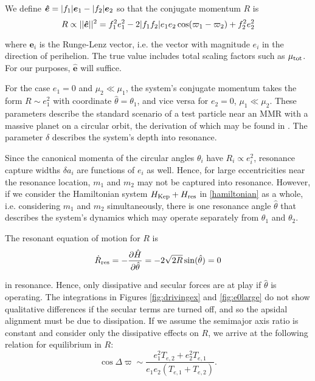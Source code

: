 \documentclass{mnras}
\renewcommand{\d}{\partial}
\renewcommand{\v}[1]{\boldsymbol{ #1 }}
\DeclarePairedDelimiter{\abs}{|}{|}
\DeclarePairedDelimiter{\norm}{||}{||}
\begin{document}
We define \(\v{\hat e} = \abs{f_1}\v e_1 - \abs{f_2}\v e_2\) so that
the conjugate momentum \(R\) is
\begin{equation}
  R \propto \norm{\v{\hat e}}^2  = f_1^2e_1^2 - 2\abs{f_1f_2}e_1e_2\cos(\varpi_1-\varpi_2) + f_2^2e_2^2
\end{equation}

where \(\v e_i\) is the Runge-Lenz vector, i.e. the vector with
magnitude \(e_i\) in the direction of perihelion. The true value
includes total scaling factors such as \(\mu_{\rm tot}\). For our
purposes, \(\v{\hat e}\) will suffice.

For the case \(e_1=0\) and \(\mu_2\ll\mu_1\), the system's conjugate
momentum takes the form \(R\sim e_1^2\) with coordinate \(\hat \theta =
\theta_1\), and vice versa for \(e_2=0\), \(\mu_1\ll\mu_2\).  These parameters
describe the standard scenario of a test particle near an MMR with a
massive planet on a circular orbit, the derivation of which may be
found in \cite{murray_solar_2000}. The parameter \(\delta\) describes the
system's depth into resonance.

Since the canonical momenta of the circular angles \(\theta_i\) have
\(R_i\propto e_i^2\), resonance capture widths \(\delta a_i\) are
functions of \(e_i\) as well. Hence, for large eccentricities near the
resonance location, \(m_1\) and \(m_2\) may not be captured into
resonance. However, if we consider the Hamiltonian system \(H_{\rm
Kep} + H_{\rm res}\) in \eqref{hamiltonian} as a whole, i.e. considering
\(m_1\) and \(m_2\) simultaneously, there is one resonance angle
\(\hat\theta\) that describes the system's dynamics which may operate
separately from \(\theta_1\) and \(\theta_2\).


The resonant equation of motion for \(R\) is
\begin{equation}
  \dot R_{\rm res} = -\frac{\d \hat H}{\d \hat\theta} = -2\sqrt{2R}\sin(\hat\theta) = 0
\end{equation}

in resonance.  Hence, only dissipative and secular forces are at play
if \(\hat\theta\) is operating.  The integrations in Figures
\ref{fig:drivingex} and \ref{fig:e0large} do not show qualitative
differences if the secular terms are turned off, and so the apsidal
alignment must be due to dissipation. If we assume the semimajor axis
ratio is constant and consider only the dissipative effects on \(R\), we
arrive at the following relation for equilibrium in \(R\):
\begin{equation}
  \label{eq:diseqR}
  \cos\Delta\varpi \sim \frac{e_1^2 T_{e,2} + e_2^2 T_{e,1}}{e_1e_2(T_{e,1}+T_{e,2})}.
\end{equation}
\end{document}
